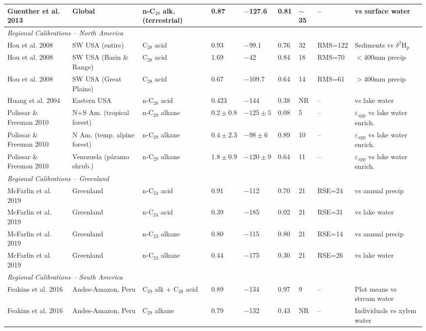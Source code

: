 \documentclass[11pt]{article}
\begin{document}
\begin{longtable}{@{}p{3.5cm}p{3.2cm}p{3.5cm}p{1.5cm}p{1.5cm}p{0.8cm}p{0.9cm}p{1.3cm}p{3.8cm}@{}}
Guenther et al. 2013 & Global & n-C$_{29}$ alk. (terrestrial) & 0.87 & $-$127.6 & 0.81 & $\sim$35 & -- & vs surface water \\
\midrule
\multicolumn{9}{l}{\textit{Regional Calibrations -- North America}} \\
\midrule
Hou et al. 2008 & SW USA (entire) & C$_{28}$ acid & 0.93 & $-$99.1 & 0.76 & 32 & RMS=122 & Sediments vs $\delta^2$H$_{\text{p}}$ \\
Hou et al. 2008 & SW USA (Basin \& Range) & C$_{28}$ acid & 1.69 & $-$42 & 0.84 & 18 & RMS=70 & $<$400mm precip \\
Hou et al. 2008 & SW USA (Great Plains) & C$_{28}$ acid & 0.67 & $-$109.7 & 0.64 & 14 & RMS=61 & $>$400mm precip \\
Huang et al. 2004 & Eastern USA & n-C$_{28}$ acid & 0.423 & $-$144 & 0.38 & NR & -- & vs lake water \\
Polissar \& Freeman 2010 & N+S Am. (tropical forest) & n-C$_{29}$ alkane & $0.2\pm0.8$ & $-125\pm5$ & 0.08 & 5 & -- & $\varepsilon_{\text{app}}$ vs lake water enrich. \\
Polissar \& Freeman 2010 & N Am. (temp. alpine forest) & n-C$_{29}$ alkane & $0.4\pm2.3$ & $-98\pm6$ & 0.89 & 10 & -- & $\varepsilon_{\text{app}}$ vs lake water enrich. \\
Polissar \& Freeman 2010 & Venezuela (páramo shrub.) & n-C$_{29}$ alkane & $1.8\pm0.9$ & $-120\pm9$ & 0.64 & 11 & -- & $\varepsilon_{\text{app}}$ vs lake water enrich. \\
\midrule
\multicolumn{9}{l}{\textit{Regional Calibrations -- Greenland}} \\
\midrule
McFarlin et al. 2019 & Greenland & n-C$_{24}$ acid & 0.91 & $-$112 & 0.70 & 21 & RSE=24 & vs annual precip \\
McFarlin et al. 2019 & Greenland & n-C$_{24}$ acid & 0.39 & $-$185 & 0.02 & 21 & RSE=31 & vs lake water \\
McFarlin et al. 2019 & Greenland & n-C$_{23}$ alkane & 0.80 & $-$115 & 0.80 & 21 & RSE=14 & vs annual precip \\
McFarlin et al. 2019 & Greenland & n-C$_{23}$ alkane & 0.44 & $-$175 & 0.30 & 21 & RSE=26 & vs lake water \\
\midrule
\multicolumn{9}{l}{\textit{Regional Calibrations -- South America}} \\
\midrule
Feakins et al. 2016 & Andes-Amazon, Peru & C$_{29}$ alk + C$_{28}$ acid & 0.89 & $-$134 & 0.97 & 9 & -- & Plot means vs stream water \\
Feakins et al. 2016 & Andes-Amazon, Peru & C$_{29}$ alkane & 0.79 & $-$132 & 0.43 & NR & -- & Individuals vs xylem water \\

\end{longtable}
\end{document}
